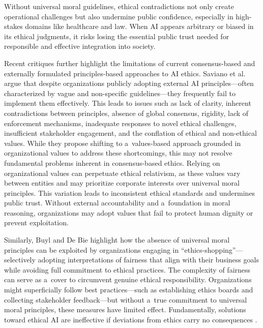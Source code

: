 \documentclass[%
  manuscript=article,
  year=2024,
  volume=77,
  doi=00000.000,
]{zfn}
\begin{document}
Without universal moral guidelines, ethical contradictions not only create operational challenges but also undermine public confidence, especially in high-stakes domains like healthcare and law. When AI appears arbitrary or biased in its ethical judgments, it risks losing the essential public trust needed for responsible and effective integration into society.



Recent critiques further highlight the limitations of current consensus-based and externally formulated principles-based approaches to AI ethics. Saviano et al. 
\parencite*[][]{saviano_reimagining_2024} %
 argue that despite organizations publicly adopting external AI principles---often characterized by vague and non-specific guidelines---they frequently fail to implement them effectively. This leads to issues such as lack of clarity, inherent contradictions between principles, absence of global consensus, rigidity, lack of enforcement mechanisms, inadequate responses to novel ethical challenges, insufficient stakeholder engagement, and the conflation of ethical and non-ethical values. While they propose shifting to a~values-based approach grounded in organizational values to address these shortcomings, this may not resolve fundamental problems inherent in consensus-based ethics. Relying on organizational values can perpetuate ethical relativism, as these values vary between entities and may prioritize corporate interests over universal moral principles. This variation leads to inconsistent ethical standards and undermines public trust. Without external accountability and a~foundation in moral reasoning, organizations may adopt values that fail to protect human dignity or prevent exploitation.



Similarly, Buyl and De Bie 
\parencite*[][]{buyl_inherent_2024} %
 highlight how the absence of universal moral principles can be exploited by organizations engaging in ``ethics-shopping''---selectively adopting interpretations of fairness that align with their business goals while avoiding full commitment to ethical practices. The complexity of fairness can serve as a~cover to circumvent genuine ethical responsibility. Organizations might superficially follow best practices---such as establishing ethics boards and collecting stakeholder feedback---but without a~true commitment to universal moral principles, these measures have limited effect. Fundamentally, solutions toward ethical AI are ineffective if deviations from ethics carry no consequences 
\parencite[][]{buyl_inherent_2024}.%
\end{document}
